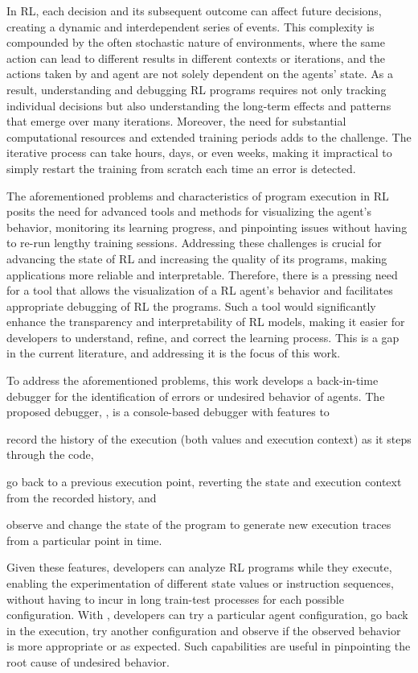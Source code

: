 In \ac{RL}, each decision and its subsequent outcome can affect future decisions, 
creating a dynamic and interdependent series of events. This complexity is 
compounded by the often stochastic nature of environments, where the same action 
can lead to different results in different contexts or iterations, and the actions taken by and agent 
are not solely dependent on the agents' state. As a result, 
understanding and debugging \ac{RL} programs requires not only tracking individual 
decisions but also understanding the long-term effects and patterns that emerge 
over many iterations.
Moreover, the need for substantial computational resources and extended training 
periods adds to the challenge. The iterative process can take hours, days, or 
even weeks, making it impractical to simply restart the training from scratch 
each time an error is detected.

The aforementioned problems and characteristics of program execution in \ac{RL} posits the need 
for advanced tools and methods for visualizing the agent's behavior, monitoring its learning 
progress, and pinpointing issues without having to re-run lengthy training sessions.
Addressing these challenges is crucial for advancing the state of \ac{RL} and increasing the quality 
of its programs, making applications more reliable and interpretable.
Therefore, there is a pressing need for a tool that allows the visualization 
of a \ac{RL} agent's behavior and facilitates appropriate debugging of \ac{RL} the programs. 
Such a tool would significantly enhance the transparency and interpretability 
of \ac{RL} models, making it easier for developers to understand, refine, and correct 
the learning process. This is a gap in the current literature, and addressing it 
is the focus of this work.

To address the aforementioned problems, this work develops a back-in-time debugger for the 
identification of errors or undesired behavior of agents. The proposed debugger, \flik, is a 
console-based debugger with features to 
\begin{enumerate*}[label=(\arabic*)]
\item record the history of the execution (both values and execution context) as it steps through the 
code,
\item go back to a previous execution point, reverting the state and execution context from the 
recorded history, and 
\item observe and change the state of the program to generate new execution traces from a particular 
point in time.
\end{enumerate*}
Given these features, developers can analyze \ac{RL} programs while they execute, enabling the 
experimentation of different state values or instruction sequences, without having to incur in long 
train-test processes for each possible configuration. With \flik, developers can try a particular agent 
configuration, go back in the execution, try another configuration and observe if the observed 
behavior is more appropriate or as expected. Such capabilities are useful in pinpointing the root 
cause of undesired behavior. 

